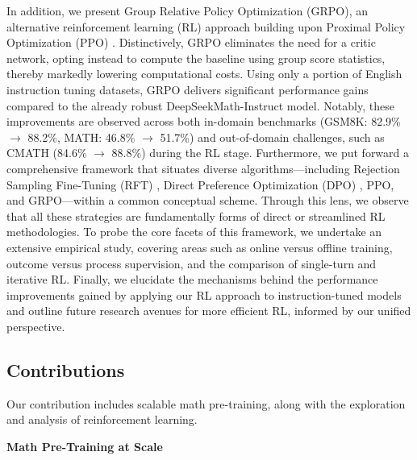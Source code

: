 In addition, we present Group Relative Policy Optimization (GRPO), an alternative reinforcement learning (RL) approach building upon Proximal Policy Optimization (PPO) \citep{schulman2017proximal}. Distinctively, GRPO eliminates the need for a critic network, opting instead to compute the baseline using group score statistics, thereby markedly lowering computational costs. Using only a portion of English instruction tuning datasets, GRPO delivers significant performance gains compared to the already robust DeepSeekMath-Instruct model. Notably, these improvements are observed across both in-domain benchmarks (GSM8K: 82.9\% $\rightarrow$ 88.2\%, MATH: 46.8\% $\rightarrow$ 51.7\%) and out-of-domain challenges, such as CMATH (84.6\% $\rightarrow$ 88.8\%) during the RL stage. Furthermore, we put forward a comprehensive framework that situates diverse algorithms—including Rejection Sampling Fine-Tuning (RFT) \citep{yuan2023scaling}, Direct Preference Optimization (DPO) \citep{dpo}, PPO, and GRPO—within a common conceptual scheme. Through this lens, we observe that all these strategies are fundamentally forms of direct or streamlined RL methodologies. To probe the core facets of this framework, we undertake an extensive empirical study, covering areas such as online versus offline training, outcome versus process supervision, and the comparison of single-turn and iterative RL. Finally, we elucidate the mechanisms behind the performance improvements gained by applying our RL approach to instruction-tuned models and outline future research avenues for more efficient RL, informed by our unified perspective.

\subsection{Contributions}
Our contribution includes scalable math pre-training, along with the exploration and analysis of reinforcement learning.

\textbf{Math Pre-Training at Scale}

